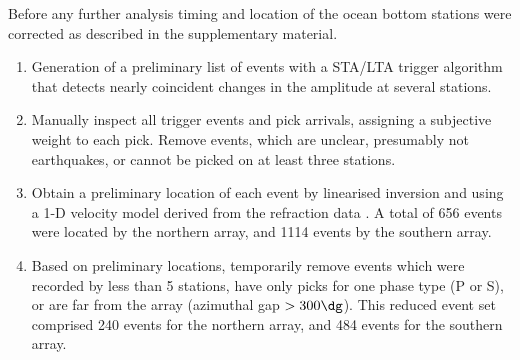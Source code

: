 \documentclass[reviewcopy]{elsarticle}
\begin{document}
Before any further analysis timing and location of the ocean bottom
stations were corrected as described in the supplementary material.
\begin{enumerate}
\item Generation of  a preliminary list of events
with a STA/LTA trigger algorithm that  detects nearly
coincident changes in the amplitude at several stations.
\item Manually inspect all trigger events and pick arrivals, assigning
a subjective weight to each pick. Remove
events, which are unclear, presumably not earthquakes, or cannot be
picked on at least three stations.
\item Obtain a preliminary location of each event by linearised
inversion and using a 1-D velocity model derived from the refraction
data \citep[see supplementary material for velocity
model]{scherwath06}.   %
A total of 656 events were located by the northern array, and 1114
events by the southern array.
\item Based on preliminary locations, temporarily remove events which
  were recorded by less than 5 stations, have only picks for one phase
  type (P or S), or are far from the array (azimuthal gap
  $>300\dg$).
 This reduced event set comprised 240  events for the
  northern array, and 484 events for the southern array.


\end{enumerate}
\end{document}
